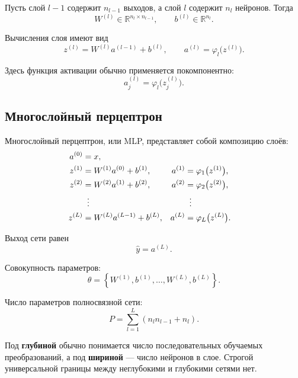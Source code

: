 \documentclass[12pt,a4paper]{article}
\theoremstyle{plain}
\theoremstyle{definition}
\theoremstyle{remark}
\newcommand{\R}{\mathbb{R}}
\begin{document}
Пусть слой $l-1$ содержит $n_{l-1}$ выходов, а слой $l$ содержит
$n_l$ нейронов. Тогда
\[
    W^{(l)}\in\R^{n_l\times n_{l-1}},
    \qquad
    b^{(l)}\in\R^{n_l}.
\]

Вычисления слоя имеют вид
\[
    z^{(l)}
    =
    W^{(l)}a^{(l-1)}+b^{(l)},
    \qquad
    a^{(l)}
    =
    \varphi_l\bigl(z^{(l)}\bigr).
\]

Здесь функция активации обычно применяется покомпонентно:
\[
    a_j^{(l)}
    =
    \varphi_l\bigl(z_j^{(l)}\bigr).
\]

\subsection{Многослойный перцептрон}

Многослойный перцептрон, или MLP, представляет собой композицию
слоёв:
\[
\begin{aligned}
    a^{(0)} &= x,\\
    z^{(1)} &= W^{(1)}a^{(0)}+b^{(1)},&
    a^{(1)} &= \varphi_1\bigl(z^{(1)}\bigr),\\
    z^{(2)} &= W^{(2)}a^{(1)}+b^{(2)},&
    a^{(2)} &= \varphi_2\bigl(z^{(2)}\bigr),\\
    &\vdotswithin{=}& &\vdotswithin{=}\\
    z^{(L)} &= W^{(L)}a^{(L-1)}+b^{(L)},&
    a^{(L)} &= \varphi_L\bigl(z^{(L)}\bigr).
\end{aligned}
\]

Выход сети равен
\[
    \widehat{y}=a^{(L)}.
\]

Совокупность параметров:
\[
    \theta
    =
    \left\{
        W^{(1)},b^{(1)},
        \ldots,
        W^{(L)},b^{(L)}
    \right\}.
\]

Число параметров полносвязной сети:
\[
    P
    =
    \sum_{l=1}^{L}
    \left(
        n_l n_{l-1}+n_l
    \right).
\]

Под \textbf{глубиной} обычно понимается число последовательных
обучаемых преобразований, а под \textbf{шириной} --- число нейронов
в слое. Строгой универсальной границы между неглубокими и глубокими
сетями нет.

\begin{center}
\end{center}
\end{document}
